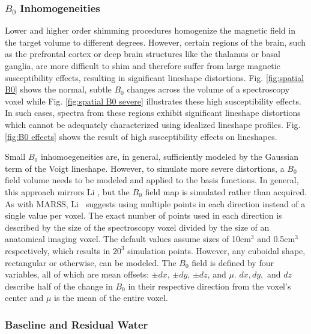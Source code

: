 \subsubsection{$B_0$ Inhomogeneities}
Lower and higher order shimming procedures homogenize the magnetic field in the target volume to different degrees. However, certain regions of the brain, such as the prefrontal cortex or deep brain structures like the thalamus or basal ganglia, are more difficult to shim and therefore suffer from large magnetic susceptibility effects, resulting in significant lineshape distortions. Fig. \ref{fig:spatial B0} shows the normal, subtle $B_0$ changes across the volume of a spectroscopy voxel while Fig. \ref{fig:spatial B0 severe} illustrates these high susceptibility effects. In such cases, spectra from these regions exhibit significant lineshape distortions which cannot be adequately characterized using idealized lineshape profiles. Fig. \ref{fig:B0 effects} shows the result of high susceptibility effects on lineshapes.



Small $B_0$ inhomoegeneities are, in general, sufficiently modeled by the Gaussian term of the Voigt lineshape. However, to simulate more severe distortions, a $B_0$ field volume needs to be modeled and applied to the basis functions. In general, this approach mirrors Li \etal\cite{Li2015}, but the $B_0$ field map is simulated rather than acquired. As with MARSS, Li \etal\ suggests using multiple points in each direction instead of a single value per voxel. The exact number of points used in each direction is described by the size of the spectroscopy voxel divided by the size of an anatomical imaging voxel. The default values assume sizes of 10cm$^3$ and 0.5cm$^3$ respectively, which results in $20^3$ simulation points. However, any cuboidal shape, rectangular or otherwise, can be modeled. The $B_0$ field is defined by four variables, all of which are mean offsets: $\pm dx$, $\pm dy$, $\pm dz$, and $\mu$. $dx, dy,$ and $dz$ describe half of the change in $B_0$ in their respective direction from the voxel's center and $\mu$ is the mean of the entire voxel. 
 
\subsubsection{Baseline and Residual Water}



